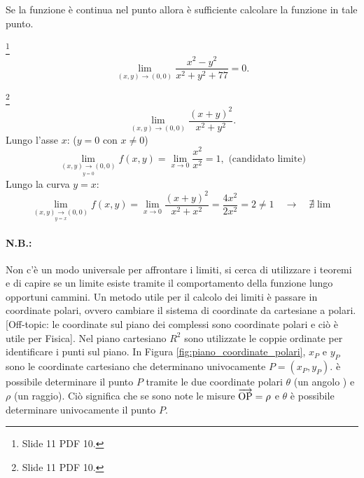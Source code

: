 Se la funzione è continua nel punto allora è sufficiente calcolare la funzione in tale punto.
\begin{example}\footnote{Slide 11 PDF 10.}
    \begin{equation*}
        \lim_{(x,y)\rightarrow(0,0)}\frac{x^2-y^2}{x^2+y^2+77}=0.
    \end{equation*}
\end{example}

\begin{example}\footnote{Slide 11 PDF 10.}
    \begin{equation*}
        \lim_{(x,y)\rightarrow(0,0)}\frac{(x+y)^2}{x^2+y^2}.
    \end{equation*}
    Lungo l'asse $x$: ($y=0$ con $x\neq 0$)
    \begin{equation*}
        \lim_{\underset{y=0}{(x,y)\rightarrow(0,0)}}f(x,y)=\lim_{x\rightarrow 0}\frac{x^2}{x^2}=1, \text{ (candidato limite)}
    \end{equation*}
    Lungo la curva $y=x$:
    \begin{equation*}
        \lim_{\underset{y=x}{(x,y)\rightarrow(0,0)}}f(x,y)=\lim_{x\rightarrow 0}\frac{(x+y)^2}{x^2+x^2} = \frac{4x^2}{2x^2}=2\neq 1\quad\longrightarrow\quad\nexists\lim
    \end{equation*}
\end{example}

\paragraph{N.B.:} Non c'è un modo universale per affrontare i limiti, si cerca di utilizzare i teoremi e di capire se un limite esiste tramite il comportamento della funzione lungo opportuni cammini. Un metodo utile per il calcolo dei limiti è passare in coordinate polari, ovvero cambiare il sistema di coordinate da cartesiane a polari. [Off-topic: le coordinate sul piano dei complessi sono coordinate polari e ciò è utile per Fisica]. Nel piano cartesiano $R^2$ sono utilizzate le coppie ordinate per identificare i punti sul piano. In Figura \ref{fig:piano_coordinate_polari}, $x_P$ e $y_P$ sono le coordinate cartesiano che determinano univocamente $P=(x_P, y_P)$. è possibile determinare il punto $P$ tramite le due coordinate polari $\theta$ (un angolo \footnotemark) e $\rho$ (un raggio). Ciò significa che se sono note le misure $\overrightarrow{\rm OP}=\rho$ e $\theta$ è possibile determinare univocamente il punto $P$. 

